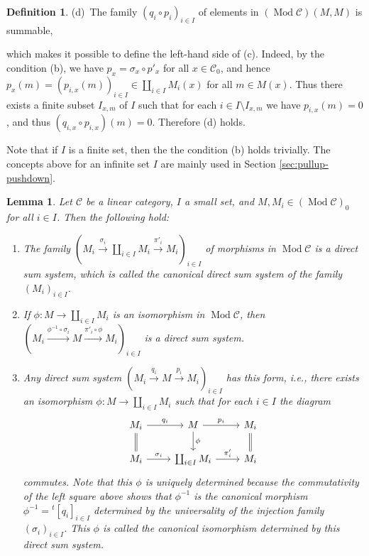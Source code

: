 \documentclass{surv-l}
\numberwithin{equation}{chapter}
\numberwithin{figure}{chapter}
\theoremstyle{plain}
\newtheorem{lem}[thm]{Lemma}
\theoremstyle{definition}
\newtheorem{dfn}[thm]{Definition}
\theoremstyle{remark}
\newcommand{\Ar}[3]{\ar[from={#1}, to={#2}, #3]}
\DeclareMathOperator{\Mod}{Mod}
\begin{document}
\begin{dfn}
(d)\ The family $(q_i \circ p_i)_{i\in I}$ of elements in $(\Mod{\mathcal{C}})(M, M)$
is summable,

which makes it possible to define the left-hand side of (c).
Indeed,
by the condition (b),
we have $p_x = \sigma_x \circ p'_x$ for all $x \in {\mathcal{C}}_0$, and hence
$p_x(m) = (p_{i,x}(m))_{i\in I} \in \coprod_{i\in I}M_i(x)$ for all
$m \in M(x)$.
Thus there exists a finite subset $I_{x,m}$ of $I$ such that
for each $i \in I \setminus I_{x,m}$ we have
$p_{i,x}(m) = 0$, and thus
$(q_{i,x} \circ p_{i,x})(m) = 0$.
Therefore (d) holds.

Note that if $I$ is a finite set, then the the condition (b) holds trivially.
The concepts above for an infinite set $I$
are mainly used in Section \ref{sec:pullup-pushdown}.
\end{dfn}

\begin{lem}\label{lem:standard-dss}
Let ${\mathcal{C}}$ be a linear category,
$I$ a small set, and $M, M_i \in (\Mod{\mathcal{C}})_0$
for all $i\in I$.
Then the following hold:
\begin{enumerate}
\item
The family $(M_i \xrightarrow{\sigma_i} \coprod_{i\in I} M_i \xrightarrow{\pi'_i} M_i)_{i\in I}$
of morphisms in $\Mod{\mathcal{C}}$
is a direct sum system, which is called
the \emph{canonical direct sum system} of the family $(M_i)_{i\in I}$.
\item
If $\phi \colon M \to \coprod_{i\in I} M_i$ is an isomorphism in
$\Mod{\mathcal{C}}$, then
$(M_i \xrightarrow{\phi^{-1} \circ\sigma_i} M\xrightarrow{\pi'_i\circ \phi} M_i)_{i\in I}$
is a direct sum system.
\item
Any direct sum system $( M_i \xrightarrow{q_i} M \xrightarrow{p_i} M_i)_{i\in I}$
has this form, i.e., there exists an isomorphism
$\phi \colon M \to \coprod_{i\in I} M_i$ such that for each
$i \in I$ the diagram
\[
\begin{tikzcd}
M_i & M & M_i\\
M_i&  \coprod_{i\in I}M_i & M_i
\Ar{1-1}{1-2}{"q_i"}
\Ar{1-2}{1-3}{"p_i"}
\Ar{2-1}{2-2}{"\sigma_i"}
\Ar{2-2}{2-3}{"\pi'_i"}
\Ar{1-1}{2-1}{ equal}
\Ar{1-2}{2-2}{"\phi"}
\Ar{1-3}{2-3}{equal}
\end{tikzcd}
\]
commutes.
Note that this $\phi$ is uniquely determined because
the commutativity of the left square above shows that
$\phi^{-1}$ is the canonical morphism $\phi^{-1} = {}^t[q_i]_{i\in I}$
determined by the universality of the injection family $(\sigma_i)_{i\in I}$.
This $\phi$ is called the \emph{canonical isomorphism} determined by
this direct sum system.
\end{enumerate}
\end{lem}
\end{document}
